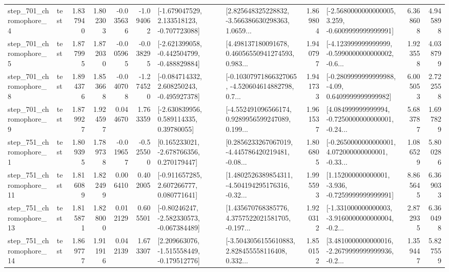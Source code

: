 \begin{tabular}{llrrrrllrlrr}
   step\_701\_chromophore\_4 &      test &      1.837940 &    1.802303 &     -0.035636 & -1.094062 &   [-1.679047529, 2.133518123, -0.707723088] &  [2.825648325228832, -3.566386630298363, 1.0659... &       1.869804 &  [-2.5680000000000005, 3.259, -0.6009999999999991] &            6.368608 &          4.945898 \\
   step\_701\_chromophore\_5 &      test &      1.877995 &    1.872030 &     -0.005965 & -0.038295 &  [-2.621399058, -0.442504799, -0.488829884] &  [4.498137180091678, 0.46056550941274593, 0.983... &       1.940797 &  [-4.123999999999999, -0.5990000000000002, -0.6... &            1.923558 &          4.038799 \\
   step\_701\_chromophore\_8 &      test &      1.894376 &    1.853668 &     -0.040708 & -1.274520 &   [-0.084714332, 2.608250243, -0.495927378] &  [-0.10307971866327065, -4.520604614882798, 0.7... &       1.941733 &   [-0.2809999999999988, -4.09, 0.6409999999999982] &            6.005053 &          2.722558 \\
   step\_701\_chromophore\_9 &      test &      1.879927 &    1.924597 &      0.044670 &  1.763359 &     [-2.630839956, 0.589114335, 0.39780055] &  [-4.552491096566174, 0.9289956599247089, 0.199... &       1.961537 &  [4.084999999999994, -0.7250000000000001, -0.24... &            5.683787 &          1.697829 \\
   step\_751\_chromophore\_1 &      test &      1.809395 &    1.789738 &     -0.019657 & -0.525500 &    [0.165233021, -2.678766356, 0.270179447] &  [0.2856233267067019, -4.445786420219481, -0.08... &       1.806805 &  [-0.2650000000000001, 4.072000000000001, -0.33... &            1.086529 &          5.800286 \\
  step\_751\_chromophore\_11 &      test &      1.816089 &    1.822499 &      0.006410 &  0.402005 &    [-0.911657285, 2.607266777, 0.080771641] &  [1.4802526389854311, -4.504194295176316, -0.32... &       1.995593 &   [1.152000000000001, -3.936, -0.7259999999999991] &            8.865645 &          6.369033 \\
  step\_751\_chromophore\_13 &      test &      1.815871 &    1.828000 &      0.012129 &  0.605501 &   [-0.80246247, -2.582330573, -0.067384489] &  [1.435670768385776, 4.3757522021581705, -0.197... &       1.920312 &  [-1.331000000000003, -3.9160000000000004, -0.2... &            2.872935 &          6.360498 \\
  step\_751\_chromophore\_14 &      test &      1.869777 &    1.911916 &      0.042139 &  1.673307 &   [2.209663076, -1.515558449, -0.179512776] &  [-3.5043056155610883, 2.828455558116408, 0.332... &       1.850152 &  [3.4810000000000016, -2.2679999999999936, -0.2... &            1.359447 &          5.827559 \\

\end{tabular}

